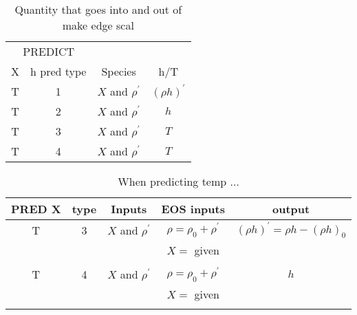 \documentclass[11pt]{article}
\begin{document}
\begin{table*}
\begin{center}
\caption{Quantity that goes into and out of make edge scal \newline}
\begin{tabular}{|c|c|c|c|}
\multicolumn{2}{c}{PREDICT} & \multicolumn{1}{c}{} & \multicolumn{1}{c}{} \\
\multicolumn{1}{c}{X} & \multicolumn{1}{c}{h pred type} & \multicolumn{1}{c}{Species } & \multicolumn{1}{c}{h/T } \\
\hline
T & 1 & $X$ and $\rho^\prime$ & $(\rho h)^\prime$ \\
T & 2 & $X$ and $\rho^\prime$ & $h$  \\
T & 3 & $X$ and $\rho^\prime$ & $T$  \\
T & 4 & $X$ and $\rho^\prime$ & $T$  \\
\hline
\end{tabular}
\end{center}
\end{table*}

\begin{table*}
\begin{center}
\caption{When predicting temp ... \newline}
\begin{tabular}{|c|c|c|c|c|}
\multicolumn{1}{c}{PRED X} & \multicolumn{1}{c}{type} & \multicolumn{1}{c}{Inputs } & 
\multicolumn{1}{c}{EOS inputs} & \multicolumn{1}{c}{output} \\
\hline
T & 3 & $X$ and $\rho^\prime$ & $\rho = \rho_0 + \rho^\prime$ &  $(\rho h)^\prime = \rho h - (\rho h)_0$ \\
  &   &                   & $   X = $ given & \\
  &   &                   &                 & \\
T & 4 & $X$ and $\rho^\prime$ & $\rho = \rho_0 + \rho^\prime$ & $h$ \\
  &   &                   & $   X = $ given & \\
  &   &                   &                 & \\
\hline
\end{tabular}
\end{center}
\end{table*}
\end{document}
